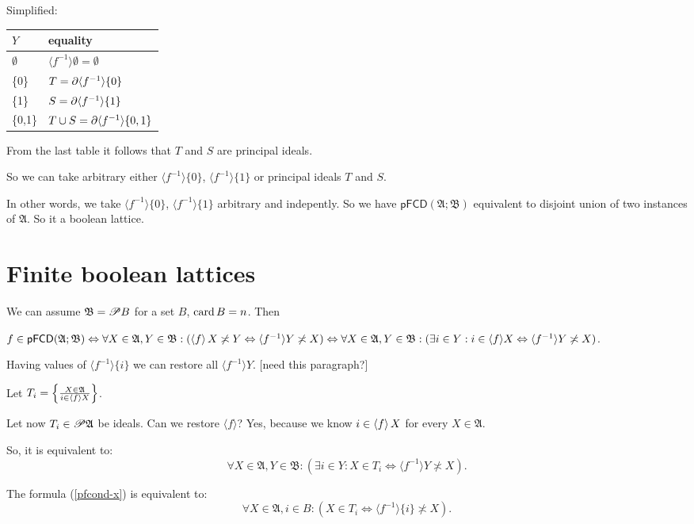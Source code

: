 Simplified:

\begin{tabular}{|l|l|}
  \hline
  $Y$ & equality \\ \hline\hline
  $\emptyset$ & $\langle f^{- 1} \rangle \emptyset = \emptyset$\\ \hline
  \{0\} & $T = \partial \langle f^{- 1} \rangle \{ 0 \}$\\ \hline
  \{1\} & $S = \partial \langle f^{- 1} \rangle \{ 1 \}$\\ \hline
  \{0,1\} & $T \cup S = \partial \langle f^{- 1} \rangle \{ 0, 1 \}$ \\
  \hline
\end{tabular}

From the last table it follows that $T$ and $S$ are principal ideals.

So we can take arbitrary either $\langle f^{- 1} \rangle \{ 0 \}$, $\langle
f^{- 1} \rangle \{ 1 \}$ or principal ideals $T$ and $S$.

In other words, we take $\langle f^{- 1} \rangle \{ 0 \}$, $\langle f^{- 1}
\rangle \{ 1 \}$ arbitrary and indepently. So we have $\mathsf{pFCD}
(\mathfrak{A}; \mathfrak{B})$ equivalent to disjoint union of two instances of
$\mathfrak{A}$. So it a boolean lattice.

\section{Finite boolean lattices}

We can assume $\mathfrak{B}= \mathscr{P} B$ for a set $B$, $\operatorname{card} B =
n$. Then

$f \in \mathsf{pFCD} (\mathfrak{A}; \mathfrak{B}) \Leftrightarrow \forall X \in
\mathfrak{A}, Y \in \mathfrak{B}: (\left\langle f\right\rangle X \not\asymp Y
\Leftrightarrow \langle f^{- 1} \rangle Y \not\asymp X) \Leftrightarrow \forall X
\in \mathfrak{A}, Y \in \mathfrak{B}: (\exists i \in Y : i \in \langle f
\rangle X \Leftrightarrow \langle f^{- 1} \rangle Y \not\asymp X)$.

Having values of $\langle f^{- 1} \rangle \{ i \}$ we can restore all $\langle
f^{- 1} \rangle Y$. [need this paragraph?]

Let $T_i = \left\{ \frac{ X \in \mathfrak{A} }{ i \in
\left\langle f\right\rangle X }\right\}$.

Let now $T_i \in \mathscr{P} \mathfrak{A}$ be ideals. Can we restore $\langle
f \rangle$? Yes, because we know $i \in \left\langle f\right\rangle X$ for every $X \in
\mathfrak{A}$.

So, it is equivalent to:
\begin{equation}
  \label{pfcond-x} \forall X \in \mathfrak{A}, Y \in \mathfrak{B}: (\exists i
  \in Y : X \in T_i \Leftrightarrow \langle f^{- 1} \rangle Y \nasymp X) .
\end{equation}
\begin{lem}
  The formula (\ref{pfcond-x}) is equivalent to:
  \begin{equation}
    \label{pfcond-i} \forall X \in \mathfrak{A}, i \in B : (X \in T_i
    \Leftrightarrow \langle f^{- 1} \rangle \{ i \} \nasymp X) .
  \end{equation}
\end{lem}

